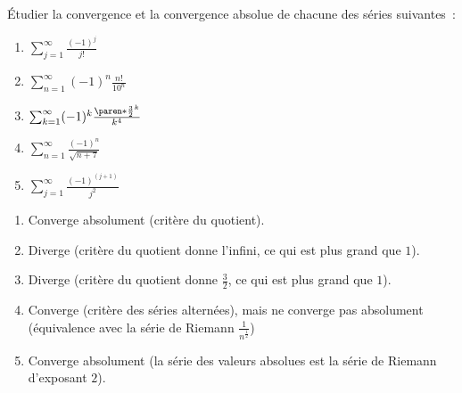 \documentclass[12pt,french,oneside,a4paper]{memoir} %
\begin{document}
\begin{exo}
Étudier la convergence et la convergence absolue de chacune des séries suivantes~:
\begin{multicols}{2}
  \begin{enumerate}
  \item $\sum_{j=1}^{\infty} \frac{(-1)^{j}}{j!}$
  \item $\sum_{n=1}^{\infty} (-1)^{n} \frac{n!}{10^{n}}$
  \item $\sum_{k=1}^{\infty} (-1)^{k} \frac{{\paren*{\frac{3}{2}}}^{k}}{k^{4}}$
  \item $\sum_{n=1}^{\infty} \frac{(-1)^{n}}{\sqrt{n+7}}$
  \item $\sum_{j=1}^{\infty} \frac{(-1)^{(j+1)}}{j^{2}}$
  \end{enumerate}
\end{multicols}
\begin{correction}
  \begin{enumerate}
  \item Converge absolument (critère du quotient).
  \item Diverge (critère du quotient donne l'infini, ce qui est plus grand que $1$).
  \item Diverge (critère du quotient donne $\frac 32$, ce qui est plus grand que $1$).
  \item Converge (critère des séries alternées), mais ne converge pas absolument (équivalence avec la série de Riemann $\frac1{n^{\frac 12}}$)
  \item Converge absolument (la série des valeurs absolues est la série de Riemann d'exposant $2$).
  \end{enumerate}
\end{correction}
\end{exo}
\end{document}
